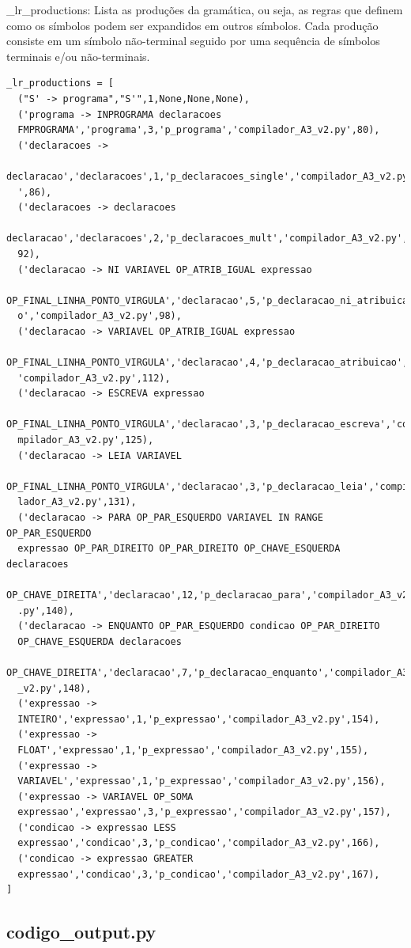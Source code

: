 \documentclass[a4paper,12pt]{article}
\begin{document}
\_lr\_productions: Lista as produções da gramática, ou seja, as regras 
que definem como os símbolos podem ser expandidos em outros símbolos. 
Cada produção consiste em um símbolo não-terminal seguido por uma 
sequência de símbolos terminais e/ou não-terminais.
\begin{Verbatim}
_lr_productions = [
  ("S' -> programa","S'",1,None,None,None),
  ('programa -> INPROGRAMA declaracoes 
  FMPROGRAMA','programa',3,'p_programa','compilador_A3_v2.py',80),
  ('declaracoes -> 
  declaracao','declaracoes',1,'p_declaracoes_single','compilador_A3_v2.py
  ',86),
  ('declaracoes -> declaracoes 
  declaracao','declaracoes',2,'p_declaracoes_mult','compilador_A3_v2.py',
  92),
  ('declaracao -> NI VARIAVEL OP_ATRIB_IGUAL expressao 
  OP_FINAL_LINHA_PONTO_VIRGULA','declaracao',5,'p_declaracao_ni_atribuica
  o','compilador_A3_v2.py',98),
  ('declaracao -> VARIAVEL OP_ATRIB_IGUAL expressao 
  OP_FINAL_LINHA_PONTO_VIRGULA','declaracao',4,'p_declaracao_atribuicao',
  'compilador_A3_v2.py',112),
  ('declaracao -> ESCREVA expressao 
  OP_FINAL_LINHA_PONTO_VIRGULA','declaracao',3,'p_declaracao_escreva','co
  mpilador_A3_v2.py',125),
  ('declaracao -> LEIA VARIAVEL 
  OP_FINAL_LINHA_PONTO_VIRGULA','declaracao',3,'p_declaracao_leia','compi
  lador_A3_v2.py',131),
  ('declaracao -> PARA OP_PAR_ESQUERDO VARIAVEL IN RANGE OP_PAR_ESQUERDO 
  expressao OP_PAR_DIREITO OP_PAR_DIREITO OP_CHAVE_ESQUERDA declaracoes 
  OP_CHAVE_DIREITA','declaracao',12,'p_declaracao_para','compilador_A3_v2
  .py',140),
  ('declaracao -> ENQUANTO OP_PAR_ESQUERDO condicao OP_PAR_DIREITO 
  OP_CHAVE_ESQUERDA declaracoes 
  OP_CHAVE_DIREITA','declaracao',7,'p_declaracao_enquanto','compilador_A3
  _v2.py',148),
  ('expressao -> 
  INTEIRO','expressao',1,'p_expressao','compilador_A3_v2.py',154),
  ('expressao -> 
  FLOAT','expressao',1,'p_expressao','compilador_A3_v2.py',155),
  ('expressao -> 
  VARIAVEL','expressao',1,'p_expressao','compilador_A3_v2.py',156),
  ('expressao -> VARIAVEL OP_SOMA 
  expressao','expressao',3,'p_expressao','compilador_A3_v2.py',157),
  ('condicao -> expressao LESS 
  expressao','condicao',3,'p_condicao','compilador_A3_v2.py',166),
  ('condicao -> expressao GREATER 
  expressao','condicao',3,'p_condicao','compilador_A3_v2.py',167),
]
\end{Verbatim}

\subsection{codigo\_output.py}
\end{document}
